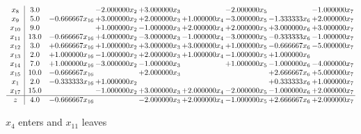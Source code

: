 \documentclass[10pt]{article}
\begin{document}
 \[\begin{array}{c| c c@{\hskip 2pt} c@{\hskip 2pt} c@{\hskip 2pt} c@{\hskip 2pt} c@{\hskip 2pt} c@{\hskip 2pt} c@{\hskip 2pt} }
 x_{8}   &  3.0  &   & -2.000000 x_{2} & + 3.000000 x_{3} &   & -2.000000 x_{5} &   & -1.000000 x_{7}\\
 x_{9}   &  5.0 & -0.666667 x_{16} & + 3.000000 x_{2} & + 2.000000 x_{3} & + 1.000000 x_{4} & -3.000000 x_{5} & -1.333333 x_{6} & + 2.000000 x_{7}\\
 x_{10}   &  9.0  &   & + 1.000000 x_{2} & -1.000000 x_{3} & + 2.000000 x_{4} & + 2.000000 x_{5} & + 3.000000 x_{6} & + 3.000000 x_{7}\\
 x_{11}   &  13.0 & -0.666667 x_{16} & + 4.000000 x_{2} & -3.000000 x_{3} & -1.000000 x_{4} & -3.000000 x_{5} & -0.333333 x_{6} & -1.000000 x_{7}\\
 x_{12}   &  3.0 & + 0.666667 x_{16} & + 1.000000 x_{2} & + 3.000000 x_{3} & + 3.000000 x_{4} & + 1.000000 x_{5} & -0.666667 x_{6} & -5.000000 x_{7}\\
 x_{13}   &  2.0 & + 1.000000 x_{16} & -1.000000 x_{2} & + 2.000000 x_{3} & + 1.000000 x_{4} & -1.000000 x_{5} & + 1.000000 x_{6} &   \\
 x_{14}   &  7.0 & + 1.000000 x_{16} & -3.000000 x_{2} & -1.000000 x_{3} &   & + 1.000000 x_{5} & -1.000000 x_{6} & -4.000000 x_{7}\\
 x_{15}   &  10.0 & -0.666667 x_{16} &   & + 2.000000 x_{3} &    &   & + 2.666667 x_{6} & + 5.000000 x_{7}\\
 x_{1}   &  2.0 & -0.333333 x_{16} & + 1.000000 x_{2} &    &    &   & + 0.333333 x_{6} & + 1.000000 x_{7}\\
 x_{17}   &  15.0  &   & -1.000000 x_{2} & + 3.000000 x_{3} & + 2.000000 x_{4} & -2.000000 x_{5} & -1.000000 x_{6} & + 2.000000 x_{7}\\
\hline
z    &  4.0 & -0.666667 x_{16} &   & -2.000000 x_{3} & + 2.000000 x_{4} & -1.000000 x_{5} & + 2.666667 x_{6} & + 2.000000 x_{7}\\
\end{array}\]


 $ x_{4} $ enters and $ x_{11} $ leaves 
\end{document}
